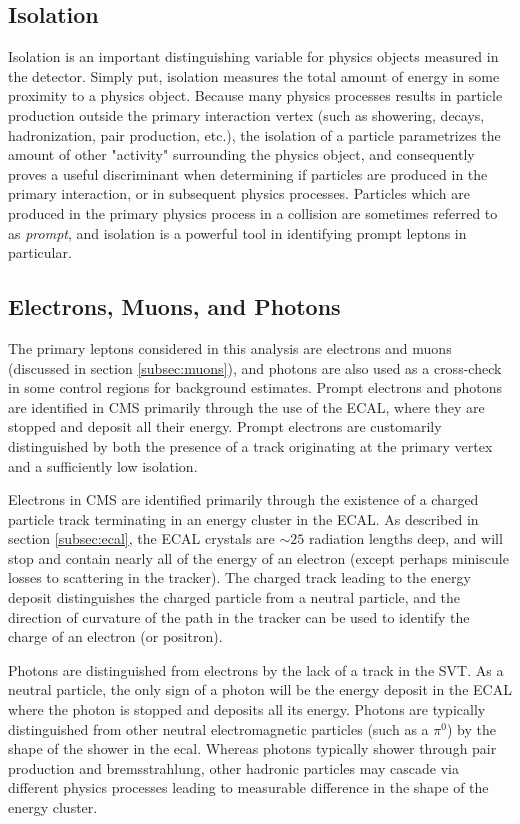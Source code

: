 \subsection{Isolation}
\label{subsec:iso}
Isolation is an important distinguishing variable for physics objects measured in the detector. Simply put, isolation measures the total amount of energy in some proximity to a physics object. Because many physics processes results in particle production outside the primary interaction vertex (such as showering, decays, hadronization, pair production, etc.), the isolation of a particle parametrizes the amount of other "activity" surrounding the physics object, and consequently proves a useful discriminant when determining if particles are produced in the primary interaction, or in subsequent physics processes. Particles which are produced in the primary physics process in a collision are sometimes referred to as {\it prompt}, and isolation is a powerful tool in identifying prompt leptons in particular.

\subsection{Electrons, Muons, and Photons}
\label{subsec:lepgamme}
The primary leptons considered in this analysis are electrons and muons (discussed in section \ref{subsec:muons}), and photons are also used as a cross-check in some control regions for background estimates. Prompt electrons and photons are identified in CMS primarily through the use of the ECAL, where they are stopped and deposit all their energy. Prompt electrons are customarily distinguished by both the presence of a track originating at the primary vertex and a sufficiently low isolation.

Electrons in CMS are identified primarily through the existence of a charged particle track terminating in an energy cluster in the ECAL. As described in section \ref{subsec:ecal}, the ECAL crystals are $\sim25$ radiation lengths deep, and will stop and contain nearly all of the energy of an electron (except perhaps miniscule losses to scattering in the tracker). The charged track leading to the energy deposit distinguishes the charged particle from a neutral particle, and the direction of curvature of the path in the tracker can be used to identify the charge of an electron (or positron).

Photons are distinguished from electrons by the lack of a track in the SVT. As a neutral particle, the only sign of a photon will be the energy deposit in the ECAL where the photon is stopped and deposits all its energy. Photons are typically distinguished from other neutral electromagnetic particles (such as a $\pi^0$) by the shape of the shower in the ecal. Whereas photons typically shower through pair production and bremsstrahlung, other hadronic particles may cascade via different physics processes leading to measurable difference in the shape of the energy cluster.

